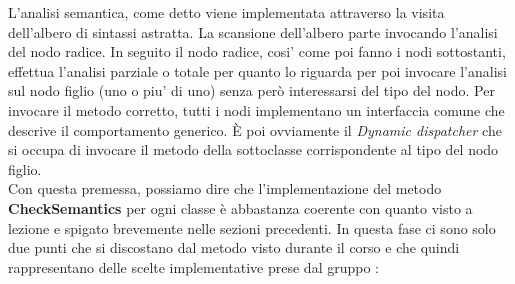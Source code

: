 \documentclass{article}
\begin{document}
L'analisi semantica, come detto viene implementata attraverso la visita dell'albero di sintassi astratta. La scansione dell'albero parte invocando l'analisi del nodo radice. In seguito il nodo radice, cosi' come poi fanno i nodi sottostanti, effettua l'analisi parziale o totale per quanto lo riguarda per poi invocare l'analisi sul nodo figlio (uno o piu' di uno) senza però interessarsi del tipo del nodo. Per invocare il metodo corretto, tutti i nodi implementano un interfaccia comune che descrive il comportamento generico. È poi ovviamente il \textit{Dynamic dispatcher} che si occupa di invocare il metodo della sottoclasse corrispondente al tipo del nodo figlio. \\
Con questa premessa, possiamo dire che l'implementazione del metodo \textbf{CheckSemantics} per ogni classe è abbastanza coerente con quanto visto a lezione e spigato brevemente nelle sezioni precedenti. In questa fase ci sono solo due punti che si discostano dal metodo visto durante il corso e che quindi rappresentano delle scelte implementative prese dal gruppo :
\end{document}
